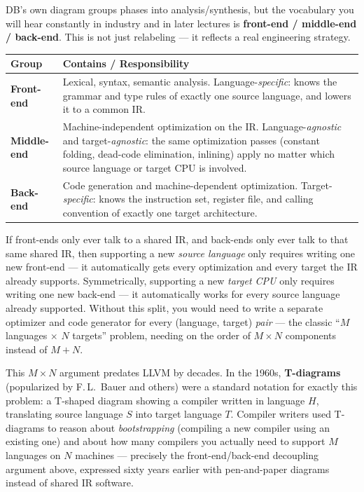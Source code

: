 \documentclass[11pt]{article}
\begin{document}
\beyonddb DB's own diagram groups phases into analysis/synthesis, but the vocabulary you will
hear constantly in industry and in later lectures is \textbf{front-end / middle-end / back-end}.
This is not just relabeling --- it reflects a real engineering strategy.

\begin{center}
\renewcommand{\arraystretch}{1.3}
\begin{tabularx}{\textwidth}{@{}l X@{}}
\toprule
\textbf{Group} & \textbf{Contains / Responsibility} \\
\midrule
\textbf{Front-end} & Lexical, syntax, semantic analysis. Language-\emph{specific}: knows the
grammar and type rules of exactly one source language, and lowers it to a common IR. \\
\textbf{Middle-end} & Machine-independent optimization on the IR. Language-\emph{agnostic} and
target-\emph{agnostic}: the same optimization passes (constant folding, dead-code elimination,
inlining) apply no matter which source language or target CPU is involved. \\
\textbf{Back-end} & Code generation and machine-dependent optimization. Target-\emph{specific}:
knows the instruction set, register file, and calling convention of exactly one target
architecture. \\
\bottomrule
\end{tabularx}
\end{center}

\begin{coreidea}
If front-ends only ever talk to a shared IR, and back-ends only ever talk to that same shared
IR, then supporting a new \emph{source language} only requires writing one new front-end --- it
automatically gets every optimization and every target the IR already supports. Symmetrically,
supporting a new \emph{target CPU} only requires writing one new back-end --- it automatically
works for every source language already supported. Without this split, you would need to write a
separate optimizer and code generator for every (language, target) \emph{pair} --- the classic
``$M$ languages $\times$ $N$ targets'' problem, needing on the order of $M \times N$ components
instead of $M + N$.
\end{coreidea}

\begin{historynote}
This $M \times N$ argument predates LLVM by decades. In the 1960s, \textbf{T-diagrams}
(popularized by F.\,L.\ Bauer and others) were a standard notation for exactly this problem:
a T-shaped diagram showing a compiler written in language $H$, translating source language $S$
into target language $T$. Compiler writers used T-diagrams to reason about \emph{bootstrapping}
(compiling a new compiler using an existing one) and about how many compilers you actually need
to support $M$ languages on $N$ machines --- precisely the front-end/back-end decoupling
argument above, expressed sixty years earlier with pen-and-paper diagrams instead of shared IR
software.
\end{historynote}
\end{document}
